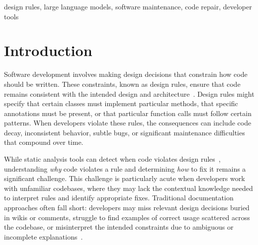 \documentclass[conference]{IEEEtran}
\begin{document}
\begin{IEEEkeywords}
design rules, large language models, software maintenance, code repair, developer tools
\end{IEEEkeywords}

\section{Introduction}

Software development involves making design decisions that constrain how code should be written. These constraints, known as design rules, ensure that code remains consistent with the intended design and architecture~\cite{mehrpour2019active}. Design rules might specify that certain classes must implement particular methods, that specific annotations must be present, or that particular function calls must follow certain patterns. When developers violate these rules, the consequences can include code decay, inconsistent behavior, subtle bugs, or significant maintenance difficulties that compound over time.

While static analysis tools can detect when code violates
design rules~\cite{nachtigall2022usability}, understanding \textit{why} code violates a rule and determining \textit{how} to fix it remains a significant challenge. This challenge is particularly acute when developers work with unfamiliar codebases, where they may lack the contextual knowledge needed to interpret rules and identify appropriate fixes. Traditional documentation approaches often fall short: developers may miss relevant design decisions buried in wikis or comments, struggle to find examples of correct usage scattered across the codebase, or misinterpret the intended constraints due to ambiguous or incomplete explanations~\cite{mehrpour2019active}.

\end{document}
